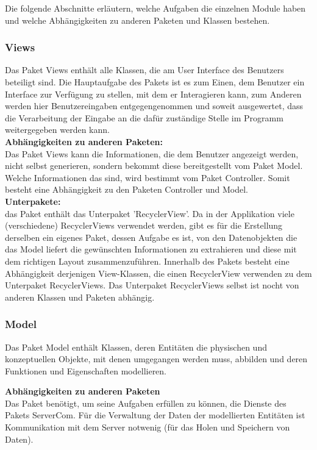 \documentclass[parskip=full]{scrartcl}
\begin{document}
Die folgende Abschnitte erläutern, welche Aufgaben die einzelnen Module haben und welche Abhängigkeiten zu anderen Paketen und Klassen bestehen.

\subsubsection{Views}
Das Paket Views enthält alle Klassen, die am User Interface des Benutzers beteiligt sind. Die Hauptaufgabe des Pakets ist es zum Einen, dem Benutzer ein Interface zur Verfügung zu stellen, mit dem er Interagieren kann, zum Anderen werden hier Benutzereingaben entgegengenommen und soweit ausgewertet, dass die Verarbeitung der Eingabe an die dafür zuständige Stelle im Programm weitergegeben werden kann.\\

\textbf{Abhängigkeiten zu anderen Paketen:}\\
Das Paket Views kann die Informationen, die dem Benutzer angezeigt werden, nicht selbst generieren, sondern bekommt diese bereitgestellt vom Paket Model. Welche Informationen das sind, wird bestimmt vom Paket Controller. Somit besteht eine Abhängigkeit zu den Paketen Controller und Model.\\

\textbf{Unterpakete:}\\
das Paket enthält das Unterpaket 'RecyclerView'. Da in der Applikation viele (verschiedene) RecyclerViews verwendet werden, gibt es für die Erstellung derselben ein eigenes Paket, dessen Aufgabe es ist, von den Datenobjekten die das Model liefert die gewünschten Informationen zu extrahieren und diese mit dem richtigen Layout zusammenzuführen. Innerhalb des Pakets besteht eine Abhängigkeit derjenigen View-Klassen, die einen RecyclerView verwenden zu dem Unterpaket RecyclerViews. Das Unterpaket RecyclerViews selbst ist nocht von anderen Klassen und Paketen abhängig.

\subsubsection{Model}
Das Paket Model enthält Klassen, deren Entitäten die physischen und konzeptuellen Objekte, mit denen umgegangen werden muss, abbilden und deren Funktionen und Eigenschaften modellieren.

\textbf{Abhängigkeiten zu anderen Paketen}\\
Das Paket benötigt, um seine Aufgaben erfüllen zu können, die Dienste des Pakets ServerCom. Für die Verwaltung der Daten der modellierten Entitäten ist Kommunikation mit dem Server notwenig (für das Holen und Speichern von Daten).
\end{document}
